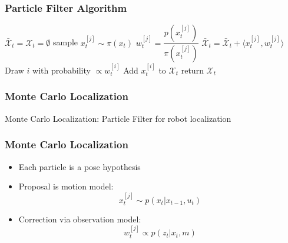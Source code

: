 \begin{frame}
    \frametitle{Particle Filter Algorithm}

    \begin{algorithmic}[1]
    \State $\bar{\mathcal{X}}_t = \mathcal{X}_t = \emptyset$
        \State sample $x_t^{[j]} \sim \pi(x_t)$
        \State $w_t^{[j]} = \dfrac{p(x_t^{[j]})}{\pi(x_t^{[j]})}$
        \State $\bar{\mathcal{X}}_t = \bar{\mathcal{X}}_t + \langle x_t^{[j]}, w_t^{[j]}\rangle$
    \EndFor
        \State Draw $i$ with probability $\propto w_t^{[i]}$
        \State Add $x_t^{[i]}$ to $\mathcal{X}_t$
    \EndFor
    \State return $\mathcal{X}_t$
    \EndProcedure
    \end{algorithmic}
\end{frame}

\begin{frame}
    \frametitle{Monte Carlo Localization}

    Monte Carlo Localization: Particle Filter for robot localization
\end{frame}

\begin{frame}
    \frametitle{Monte Carlo Localization}

    \begin{itemize}
        \item Each particle is a pose hypothesis
        \item Proposal is motion model:
        \begin{equation*}
            x_t^{[j]} \sim p(x_t | x_{t-1}, u_t)
        \end{equation*}
        \item Correction via observation model:
        \begin{equation*}
            w_t^{[j]} \propto p(z_t | x_t, m)
        \end{equation*}
    \end{itemize}
\end{frame}

